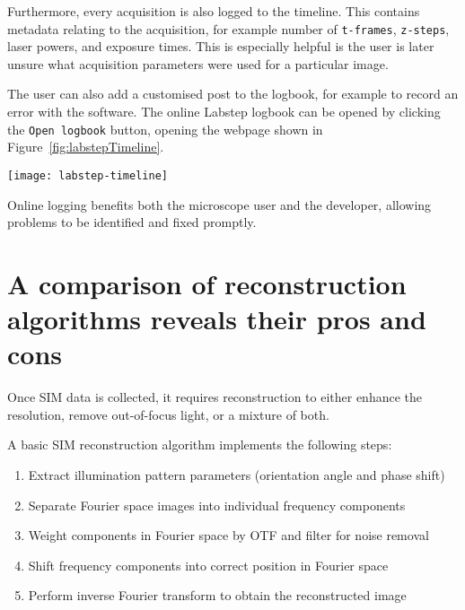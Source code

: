 Furthermore, every acquisition is also logged to the timeline.
This contains metadata relating to the acquisition, for example number of \texttt{t-frames}, \texttt{z-steps}, laser powers, and exposure times.
This is especially helpful is the user is later unsure what acquisition parameters were used for a particular image.

The user can also add a customised post to the logbook, for example to record an error with the software.
The online Labstep logbook can be opened by clicking the \texttt{Open logbook} button, opening the webpage shown in Figure~\ref{fig:labstepTimeline}.

\begin{sidewaysfigure}[p]
\centering
\texttt{[image: labstep-timeline]}
\caption[LAG SIM: Logging user activity with Labstep allows any problems to be identified and fixed quickly]{User activity is automatically logged to an online logbook hosted on Labstep to identify and fix any problems quickly. This figure shows the user logged onto the SIM at 09:00, acquired 2 images - a SIM z-stack then a 1000-frame widefield video - then logged off.}
\label{fig:labstepTimeline}
\end{sidewaysfigure}

Online logging benefits both the microscope user and the developer, allowing problems to be identified and fixed promptly.

\clearpage
\section{A comparison of reconstruction algorithms reveals their pros and cons} \label{sec:recon}
Once SIM data is collected, it requires reconstruction to either enhance the resolution, remove out-of-focus light, or a mixture of both.

A basic SIM reconstruction algorithm implements the following steps:
\begin{enumerate}
	\item Extract illumination pattern parameters (orientation angle and phase shift)
	\item Separate Fourier space images into individual frequency components
	\item \label{step:filterPreShift}Weight components in Fourier space by OTF and filter for noise removal
	\item \label{step:shiftComponents}Shift frequency components into correct position in Fourier space
	\item Perform inverse Fourier transform to obtain the reconstructed image
\end{enumerate}

